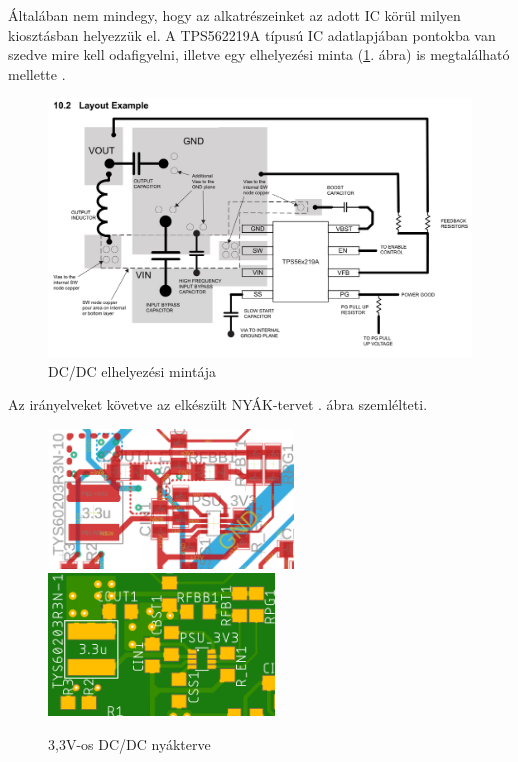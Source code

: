 \documentclass[../main.tex]{subfiles}
\begin{document}
            Általában nem mindegy, hogy az alkatrészeinket az adott IC körül milyen kiosztásban helyezzük el. A TPS562219A típusú IC adatlapjában pontokba van szedve mire kell odafigyelni, illetve egy elhelyezési minta (\ref{fig:tps_logl_example}. ábra) is megtalálható mellette \cite{ds_tps56}.
            
            \begin{figure}[h!]
                \centering
                    \includegraphics[width=12cm]{resources/pcb_res/tps_logl_example.png}
                \caption{DC/DC elhelyezési mintája \cite{ds_tps56}}
                \label{fig:tps_logl_example}
            \end{figure}
            
            Az irányelveket követve az elkészült NYÁK-tervet . ábra szemlélteti.
            
            \begin{figure}[h!]
                \centering
                    \includegraphics[width=6.5cm]{resources/pcb_res/board_dcdc_3v3}
                    \includegraphics[width=6cm]{resources/pcb_res/pcb_dcdc_3v3}
                \caption{3,3V-os DC/DC nyákterve}
                \label{fig:pcb_3v3}
            \end{figure}
            
\end{document}
